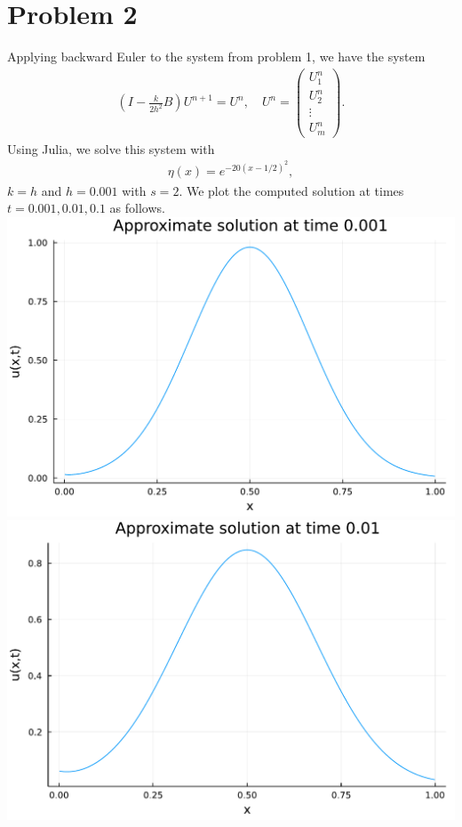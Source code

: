 \documentclass{article}
\begin{document}
\section{Problem 2}
Applying backward Euler to the system from problem 1, we have the system 
\begin{align}\label{be}
	\left( I - \frac{k}{2h^2}B \right) U^{n+1} =  U^n, \quad U^n = \begin{pmatrix} U_1^n \\ U_2^n \\ \vdots \\U_m^n \end{pmatrix}.
\end{align}
Using Julia, we solve this system with 
\begin{align*}
	\eta(x) = e^{-20(x-1/2)^2},
\end{align*}
$k = h$ and $h = 0.001$ with $s = 2$. We plot the computed solution at times $t = 0.001,0.01,0.1$ as follows. \\
\includegraphics[scale=0.5]{p2_1.pdf}\\
\includegraphics[scale=0.5]{p2_2.pdf}\\
\end{document}
